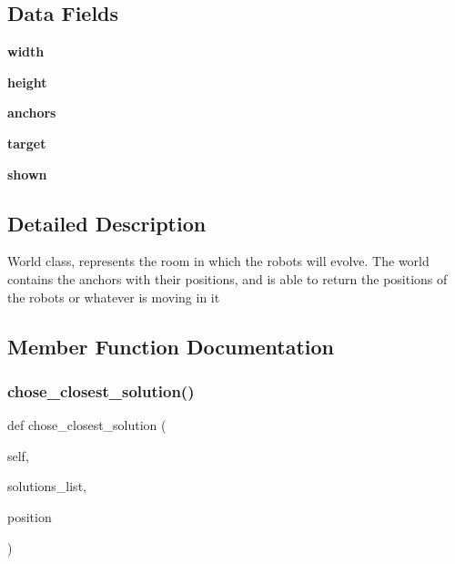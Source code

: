 \subsection*{Data Fields}
\begin{DoxyCompactItemize}
\item 
\mbox{\label{classworld_1_1_world_a5558ace5433f9aabbf0a0ec059900d94}} 
{\bfseries width}
\item 
\mbox{\label{classworld_1_1_world_a509290c21d570ff479c1b9d9b1fe8810}} 
{\bfseries height}
\item 
\mbox{\label{classworld_1_1_world_aba54450ad49ad1b46e29721241611d50}} 
{\bfseries anchors}
\item 
\mbox{\label{classworld_1_1_world_a5d2c023108742a1ce78ba9823c06ea35}} 
{\bfseries target}
\item 
\mbox{\label{classworld_1_1_world_ac6c1eeb684483c821de0ec90f6c47cb9}} 
{\bfseries shown}
\end{DoxyCompactItemize}


\subsection{Detailed Description}
\begin{DoxyVerb}World class, represents the room in which the robots will evolve.
The world contains the anchors with their positions, and is able
to return the positions of the robots or whatever is moving in it\end{DoxyVerb}
 

\subsection{Member Function Documentation}
\mbox{\label{classworld_1_1_world_ad5a97b080a28cc5abda3903a686a56ff}} 
\subsubsection{\texorpdfstring{chose\+\_\+closest\+\_\+solution()}{chose\_closest\_solution()}}
{\footnotesize\ttfamily def chose\+\_\+closest\+\_\+solution (\begin{DoxyParamCaption}\item[{}]{self,  }\item[{}]{solutions\+\_\+list,  }\item[{}]{position }\end{DoxyParamCaption})}

